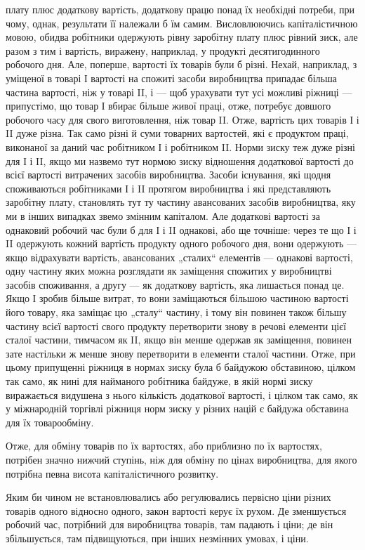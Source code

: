 \parcont{}  %
плату плюс додаткову вартість, додаткову працю понад їх необхідні
потреби, при чому, однак, результати її належали б їм
самим. Висловлюючись капіталістичною мовою, обидва робітники
одержують рівну заробітну плату плюс рівний зиск, але разом
з тим і вартість, виражену, наприклад, у продукті десятигодинного
робочого дня. Але, поперше, вартості їх товарів були б
різні. Нехай, наприклад, з уміщеної в товарі І вартості на спожиті
засоби виробництва припадає більша частина вартості, ніж у товарі
II, і — щоб урахувати тут усі можливі ріжниці — припустімо,
що товар І вбирає більше живої праці, отже, потребує довшого
робочого часу для свого виготовлення, ніж товар II. Отже, вартість
цих товарів І і II дуже різна. Так само різні й суми товарних вартостей,
які є продуктом праці, виконаної за даний час робітником
І і робітником II. Норми зиску теж дуже різні для І і II,
якщо ми назвемо тут нормою зиску відношення додаткової вартості
до всієї вартості витрачених засобів виробництва. Засоби
існування, які щодня споживаються робітниками І і II протягом
виробництва і які представляють заробітну плату, становлять
тут ту частину авансованих засобів виробництва, яку ми в інших
випадках звемо змінним капіталом. Але додаткові вартості за
однаковий робочий час були б для І і II однакові, або ще точніше:
через те що І і II одержують кожний вартість продукту
одного робочого дня, вони одержують — якщо відрахувати вартість,
авансованих „сталих“ елементів — однакові вартості, одну
частину яких можна розглядати як заміщення спожитих у виробництві
засобів споживання, а другу — як додаткову вартість,
яка лишається понад це. Якщо І зробив більше витрат, то вони
заміщаються більшою частиною вартості його товару, яка заміщає
цю „сталу“ частину, і тому він повинен також більшу
частину всієї вартості свого продукту перетворити знову в речові
елементи цієї сталої частини, тимчасом як II, якщо він
менше одержав як заміщення, повинен зате настільки ж менше
знову перетворити в елементи сталої частини. Отже, при цьому
припущенні ріжниця в нормах зиску була б байдужою обставиною,
цілком так само, як нині для найманого робітника байдуже,
в якій нормі зиску виражається видушена з нього кількість
додаткової вартості, і цілком так само, як у міжнародній торгівлі
ріжниця норм зиску у різних націй є байдужа обставина
для їх товарообміну.

Отже, для обміну товарів по їх вартостях, або приблизно
по їх вартостях, потрібен значно нижчий ступінь, ніж для обміну
по цінах виробництва, для якого потрібна певна висота капіталістичного
розвитку.

Яким би чином не встановлювались або регулювались первісно
ціни різних товарів одного відносно одного, закон вартості
керує їх рухом. Де зменшується робочий час, потрібний для
виробництва товарів, там падають і ціни; де він збільшується,
там підвищуються, при інших незмінних умовах, і ціни.
